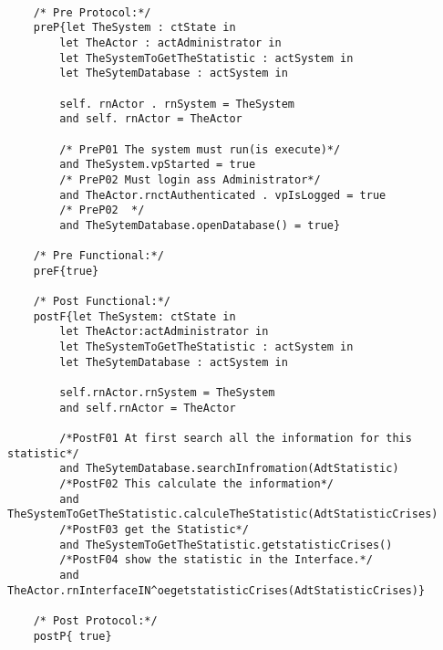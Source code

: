 	\scriptsize
	\vspace{0.5cm}
	\begin{lstlisting}[style=MessirStyle,firstnumber=auto,captionpos=b,caption={\msrmessir (MCL-oriented) specification of the operation \emph{oegetstatisticCrises}.},label=OM-actAdministrator-oegetstatisticCrises-MCL-LST]

	/* Pre Protocol:*/ 
	preP{let TheSystem : ctState in 
		let TheActor : actAdministrator in 
		let TheSystemToGetTheStatistic : actSystem in 
		let TheSytemDatabase : actSystem in 
		
		self. rnActor . rnSystem = TheSystem 
		and self. rnActor = TheActor
		
		/* PreP01 The system must run(is execute)*/
		and TheSystem.vpStarted = true
		/* PreP02 Must login ass Administrator*/
		and TheActor.rnctAuthenticated . vpIsLogged = true
		/* PreP02  */
		and TheSytemDatabase.openDatabase() = true}
	
	/* Pre Functional:*/
	preF{true}
	
	/* Post Functional:*/ 
	postF{let TheSystem: ctState in
	    let TheActor:actAdministrator in
	    let TheSystemToGetTheStatistic : actSystem in
	    let TheSytemDatabase : actSystem in 
	    
		self.rnActor.rnSystem = TheSystem
	    and self.rnActor = TheActor
	    
	    /*PostF01 At first search all the information for this statistic*/
	    and TheSytemDatabase.searchInfromation(AdtStatistic)
	    /*PostF02 This calculate the information*/
	    and TheSystemToGetTheStatistic.calculeTheStatistic(AdtStatisticCrises)
	    /*PostF03 get the Statistic*/
	    and TheSystemToGetTheStatistic.getstatisticCrises()
	    /*PostF04 show the statistic in the Interface.*/
	   	and TheActor.rnInterfaceIN^oegetstatisticCrises(AdtStatisticCrises)}
	
	/* Post Protocol:*/ 
	postP{ true}
	
	\end{lstlisting}
	\normalsize 
	
	
	
	





